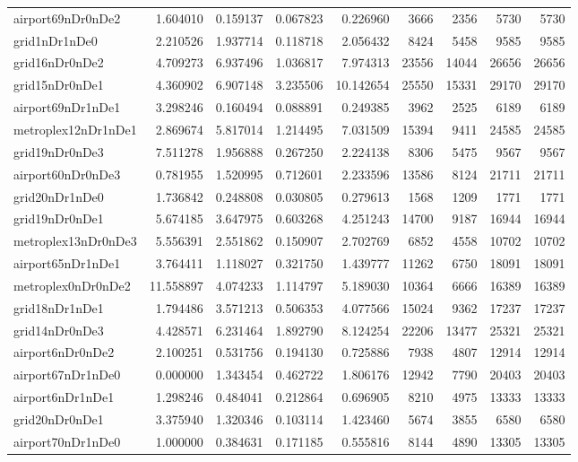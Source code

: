 \begin{longtable}{|l|r|r|r|r|r|r|r|r|}
airport69nDr0nDe2 & 1.604010 & 0.159137 & 0.067823 & 0.226960 & 3666 & 2356 & 5730 & 5730 \\
grid1nDr1nDe0 & 2.210526 & 1.937714 & 0.118718 & 2.056432 & 8424 & 5458 & 9585 & 9585 \\
grid16nDr0nDe2 & 4.709273 & 6.937496 & 1.036817 & 7.974313 & 23556 & 14044 & 26656 & 26656 \\
grid15nDr0nDe1 & 4.360902 & 6.907148 & 3.235506 & 10.142654 & 25550 & 15331 & 29170 & 29170 \\
airport69nDr1nDe1 & 3.298246 & 0.160494 & 0.088891 & 0.249385 & 3962 & 2525 & 6189 & 6189 \\
metroplex12nDr1nDe1 & 2.869674 & 5.817014 & 1.214495 & 7.031509 & 15394 & 9411 & 24585 & 24585 \\
grid19nDr0nDe3 & 7.511278 & 1.956888 & 0.267250 & 2.224138 & 8306 & 5475 & 9567 & 9567 \\
airport60nDr0nDe3 & 0.781955 & 1.520995 & 0.712601 & 2.233596 & 13586 & 8124 & 21711 & 21711 \\
grid20nDr1nDe0 & 1.736842 & 0.248808 & 0.030805 & 0.279613 & 1568 & 1209 & 1771 & 1771 \\
grid19nDr0nDe1 & 5.674185 & 3.647975 & 0.603268 & 4.251243 & 14700 & 9187 & 16944 & 16944 \\
metroplex13nDr0nDe3 & 5.556391 & 2.551862 & 0.150907 & 2.702769 & 6852 & 4558 & 10702 & 10702 \\
airport65nDr1nDe1 & 3.764411 & 1.118027 & 0.321750 & 1.439777 & 11262 & 6750 & 18091 & 18091 \\
metroplex0nDr0nDe2 & 11.558897 & 4.074233 & 1.114797 & 5.189030 & 10364 & 6666 & 16389 & 16389 \\
grid18nDr1nDe1 & 1.794486 & 3.571213 & 0.506353 & 4.077566 & 15024 & 9362 & 17237 & 17237 \\
grid14nDr0nDe3 & 4.428571 & 6.231464 & 1.892790 & 8.124254 & 22206 & 13477 & 25321 & 25321 \\
airport6nDr0nDe2 & 2.100251 & 0.531756 & 0.194130 & 0.725886 & 7938 & 4807 & 12914 & 12914 \\
airport67nDr1nDe0 & 0.000000 & 1.343454 & 0.462722 & 1.806176 & 12942 & 7790 & 20403 & 20403 \\
airport6nDr1nDe1 & 1.298246 & 0.484041 & 0.212864 & 0.696905 & 8210 & 4975 & 13333 & 13333 \\
grid20nDr0nDe1 & 3.375940 & 1.320346 & 0.103114 & 1.423460 & 5674 & 3855 & 6580 & 6580 \\
airport70nDr1nDe0 & 1.000000 & 0.384631 & 0.171185 & 0.555816 & 8144 & 4890 & 13305 & 13305 \\

\end{longtable}
